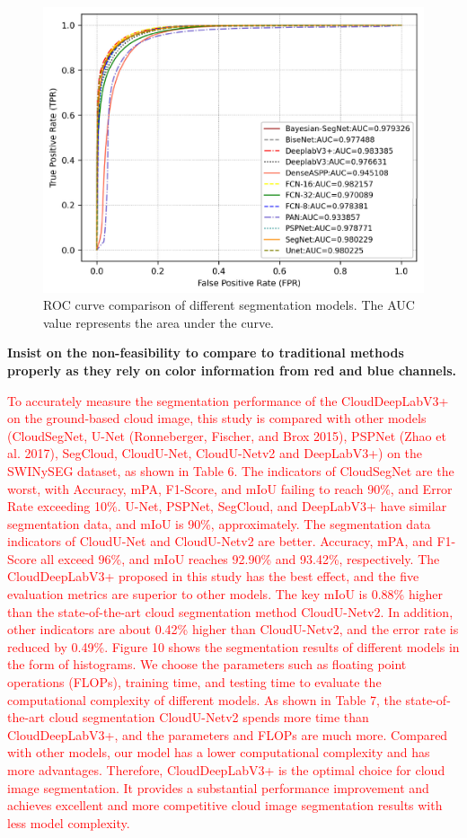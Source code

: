 \documentclass[amt, article]{copernicus}
\begin{document}
\begin{figure}[t]
	\includegraphics[width=\hsize]{figures/roc_curve.png}
	\caption{ROC curve comparison of different segmentation models. The AUC value represents the area under the curve.}
    \label{fig:roc_curve}
\end{figure}


\textbf{Insist on the non-feasibility to compare to traditional methods properly as they rely on color information from red and blue channels.}

\textcolor{red}{To accurately measure the segmentation performance of the CloudDeepLabV3+ on the ground-based cloud image, this study is compared with other models (CloudSegNet, U-Net (Ronneberger, Fischer, and Brox 2015), PSPNet (Zhao et al. 2017), SegCloud, CloudU-Net, CloudU-Netv2 and DeepLabV3+) on the SWINySEG dataset, as shown in Table 6.
The indicators of CloudSegNet are the worst, with Accuracy, mPA, F1-Score, and mIoU failing to reach 90\%, and Error Rate exceeding 10\%. U-Net, PSPNet, SegCloud, and DeepLabV3+ have similar segmentation data, and mIoU is 90\%, approximately. The segmentation data indicators of CloudU-Net and CloudU-Netv2 are better. Accuracy, mPA, and F1-Score all exceed 96\%, and mIoU reaches 92.90\% and 93.42\%, respectively. The CloudDeepLabV3+ proposed in this study has the best effect, and the five evaluation metrics are superior to other models. The key mIoU is 0.88\% higher than the state-of-the-art cloud segmentation method CloudU-Netv2. In addition, other indicators are about 0.42\% higher than CloudU-Netv2, and the error rate is reduced by 0.49\%. Figure 10 shows the segmentation results of different models in the form of histograms. We choose the parameters such as floating point operations (FLOPs), training time, and testing time to evaluate the computational complexity of different models. As shown in Table 7, the state-of-the-art cloud segmentation CloudU-Netv2 spends more time than CloudDeepLabV3+, and the parameters and FLOPs are much more. Compared with other models, our model has a lower computational complexity and has more advantages. Therefore, CloudDeepLabV3+ is the optimal choice for cloud image segmentation. It provides a substantial performance improvement and achieves excellent and more competitive cloud image segmentation results with less model complexity.}
\end{document}
